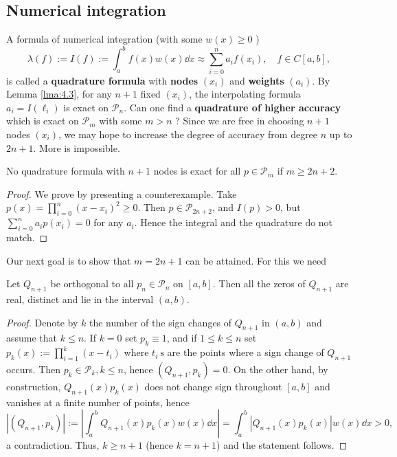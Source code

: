 \documentclass[a4paper]{article}
\begin{document}
\subsection{Numerical integration}
A formula of numerical integration (with some $w(x) \geq 0$ )
\[
\lambda(f):=I(f):=\int_a^b f(x) w(x) \dd{x} \approx \sum_{i=0}^n a_i f(x_i), \quad f \in C[a, b],
\]
is called a \textbf{quadrature formula} with \textbf{nodes} $(x_i)$ and \textbf{weights} $(a_i)$. By Lemma \ref{lma:4.3}, for any $n+1$ fixed $(x_i)$, the interpolating formula $a_i=I(\ell_i)$ is exact on $\mathcal{P}_n$. Can one find a \textbf{quadrature of higher accuracy} which is exact on $\mathcal{P}_m$ with some $m>n$ ? Since we are free in choosing $n+1$ nodes $(x_i)$, we may hope to increase the degree of accuracy from degree $n$ up to $2 n+1$. More is impossible.

\begin{lemma}
    No quadrature formula with $n+1$ nodes is exact for all $p \in \mathcal{P}_m$ if $m \geq 2 n+2$.
\end{lemma}
\begin{proof}
    We prove by presenting a counterexample. Take $p(x)=\prod_{i=0}^n(x-x_i)^2 \geq 0$. Then $p \in \mathcal{P}_{2 n+2}$, and $I(p)>0$, but $\sum_{i=0}^n a_i p(x_i)=0$ for any $a_i$. Hence the integral and the quadrature do not match.
\end{proof}
Our next goal is to show that $m=2 n+1$ can be attained. For this we need

\begin{lemma}
    Let $Q_{n+1}$ be orthogonal to all $p_n \in \mathcal{P}_n$ on $[a, b]$. Then all the zeros of $Q_{n+1}$ are real, distinct and lie in the interval $(a, b)$.
\end{lemma}
\begin{proof}
    Denote by $k$ the number of the sign changes of $Q_{n+1}$ in $(a, b)$ and assume that $k \leq n$. If $k=0$ set $p_k \equiv 1$, and if $1 \leq k \leq n$ set $p_k(x):=\prod_{i=1}^k(x-t_i)$ where $t_i \mathrm{~s}$ are the points where a sign change of $Q_{n+1}$ occurs. Then $p_k \in \mathcal{P}_k, k \leq n$, hence $(Q_{n+1}, p_k)=0$. On the other hand, by construction, $Q_{n+1}(x) p_k(x)$ does not change sign throughout $[a, b]$ and vanishes at a finite number of points, hence
    \[
        |(Q_{n+1}, p_k)|:=|\int_a^b Q_{n+1}(x) p_k(x) w(x) \dd{x}|=\int_a^b|Q_{n+1}(x) p_k(x)| w(x) \dd{x}>0,
    \]
    a contradiction. Thus, $k \geq n+1$ (hence $k=n+1$) and the statement follows.
\end{proof}
\end{document}
